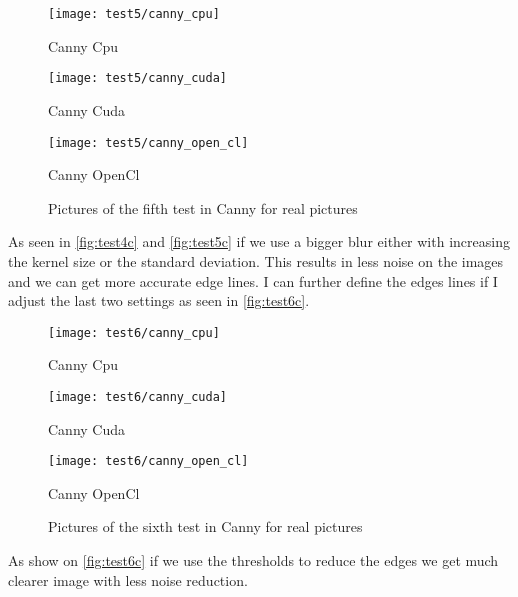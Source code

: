 \begin{figure}[H]
\centering
\begin{minipage}[t]{.325\textwidth}
\centering
\texttt{[image: test5/canny\_cpu]}
\addtocounter{figure}{-1}
\captionsetup{labelformat=empty}
\caption[]{Canny Cpu}
\end{minipage}
\begin{minipage}[t]{.325\textwidth}
\centering
\texttt{[image: test5/canny\_cuda]}
\addtocounter{figure}{-1}
\captionsetup{labelformat=empty}
\caption[]{Canny Cuda}
\end{minipage}
\begin{minipage}[t]{.325\textwidth}
\centering
\texttt{[image: test5/canny\_open\_cl]}
\addtocounter{figure}{-1}
\captionsetup{labelformat=empty}
\caption[]{Canny OpenCl}
\end{minipage}
\caption{Pictures of the fifth test in \ac{Canny} for real pictures}
\label{fig:test5c}
\end{figure}

As seen in \autoref{fig:test4c} and \autoref{fig:test5c} if we use a bigger blur either with increasing the kernel size or the standard deviation. This results in less noise on the images and we can get more accurate edge lines. I can further define the edges lines if I adjust the last two settings as seen in \autoref{fig:test6c}.

\begin{figure}[H]
\centering
\begin{minipage}[t]{.325\textwidth}
\centering
\texttt{[image: test6/canny\_cpu]}
\addtocounter{figure}{-1}
\captionsetup{labelformat=empty}
\caption[]{Canny Cpu}
\end{minipage}
\begin{minipage}[t]{.325\textwidth}
\centering
\texttt{[image: test6/canny\_cuda]}
\addtocounter{figure}{-1}
\captionsetup{labelformat=empty}
\caption[]{Canny Cuda}
\end{minipage}
\begin{minipage}[t]{.325\textwidth}
\centering
\texttt{[image: test6/canny\_open\_cl]}
\addtocounter{figure}{-1}
\captionsetup{labelformat=empty}
\caption[]{Canny OpenCl}
\end{minipage}
\caption{Pictures of the sixth test in \ac{Canny} for real pictures}
\label{fig:test6c}
\end{figure}

As show on \autoref{fig:test6c} if we use the thresholds to reduce the edges we get much clearer image with less noise reduction.

